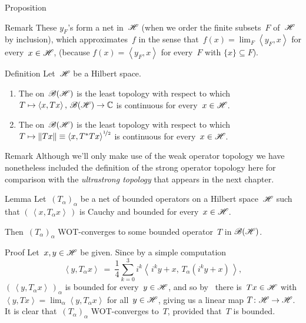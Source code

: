 \documentclass[a]{subfiles}
\begin{document}
\begin{parsec}
\begin{point}{Proposition}
\begin{point}{Remark}
These $y_F$'s form a net in~$\mathscr{H}$
(when we order the finite subsets~$F$ of~$\mathscr{H}$ by inclusion),
which approximates~$f$ in the
sense that~$f(x)=\lim_F \left<y_F,x\right>$
for every~$x\in \mathscr{H}$,
(because 
$f(x)=\left<y_F,x\right>$
for every~$F$
with $\{x\}\subseteq F$).
\end{point}
\end{point}
\begin{point}{Definition}%
Let~$\mathscr{H}$ be a Hilbert space.
\begin{enumerate}
\item
	The 
on~$\mathscr{B}(\mathscr{H})$ is the least topology
with respect to which $T\mapsto \left<x,Tx\right>,\,\mathscr{B}(\mathscr{H})\to\mathbb{C}$
is continuous for every~$x\in\mathscr{H}$.
\item
	The 
on~$\mathscr{B}(\mathscr{H})$ is the least topology
with respect to which $T\mapsto \|Tx\|\equiv \smash{\left<x,T^*Tx\right>^{%
\nicefrac{1}{2}}}$
is continuous for every~$x\in\mathscr{H}$.
\end{enumerate}
\begin{point}{Remark}%
Although we'll only make use of the weak operator
topology we have nonetheless included
the definition of the strong operator topology here
for comparison
with the \emph{ultrastrong
topology} that appears in the next chapter.
\end{point}
\end{point}
\begin{point}{Lemma}%
Let~$(T_\alpha)_\alpha$ be a net of bounded operators
on a Hilbert space~$\mathscr{H}$
such that $(\,\left<x,T_\alpha x \right>\,)$ is
Cauchy and bounded for every~$x\in \mathscr{H}$.

Then~$(T_\alpha)_\alpha$
WOT-converges to some bounded operator~$T$ in $\mathscr{B}(\mathscr{H})$.
\begin{point}{Proof}%
Let~$x,y\in \mathscr{H}$ be given.
Since by a simple computation
\begin{equation*}
	\textstyle
	\left<y,T_\alpha x\right>
	\ = \ \frac{1}{4}\sum_{k=0}^3
	i^k\left<\,i^ky+x,\,T_\alpha (i^ky+x)\,\right>,
\end{equation*}
 $(\,\left<y,T_\alpha x\right>\,)_\alpha$
is bounded for every~$y\in \mathscr{H}$,
and so by~ there is~$Tx\in \mathscr{H}$ 
with $\left<y,Tx\right>=\lim_\alpha \left<y,T_\alpha x\right>$
for all~$y\in\mathscr{H}$,
giving us a linear map $T\colon \mathscr{H}\to \mathscr{H}$.
It is clear that~$(T_\alpha)_\alpha$
WOT-converges to~$T$,
provided that~$T$ is bounded.


\end{point}
\end{point}
\end{parsec}
\end{document}
